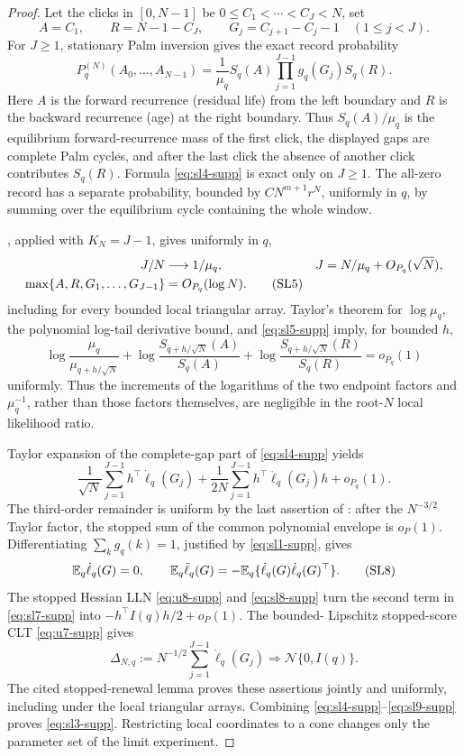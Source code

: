 \begin{proof}
Let the clicks in \([0,N-1]\) be
\(0\le C_1<\cdots<C_J<N\), set
\[
 A=C_1,\qquad R=N-1-C_J,
 \qquad G_j=C_{j+1}-C_j-1\quad(1\le j<J).
\]
For \(J\ge1\), stationary Palm inversion gives the exact record probability
\[
 P_q^{(N)}(A_0,\ldots,A_{N-1})
 =\frac1{\mu_q}S_q(A)
   \prod_{j=1}^{J-1}g_q(G_j)S_q(R).
\tag{SL4}\label{eq:sl4-supp}
\]
Here \(A\) is the forward recurrence (residual life) from the left boundary
and \(R\) is the backward recurrence (age) at the right boundary.  Thus
\(S_q(A)/\mu_q\) is the equilibrium forward-recurrence mass of the first
click, the displayed gaps are complete Palm cycles, and after the last click
the absence of another click contributes \(S_q(R)\).  Formula
\eqref{eq:sl4-supp} is exact only on \(J\ge1\).  The all-zero record has a separate
probability, bounded by \(CN^{m+1}r^N\), uniformly in \(q\), by summing over
the equilibrium cycle containing the whole window.

, applied with
\(K_N=J-1\), gives uniformly in \(q\),
\begin{align}
 J/N&\longrightarrow1/\mu_q,
 &J&=N/\mu_q+O_{P_q}(\sqrt N),\notag\\
 \max\{A,R,G_1,\ldots,G_{J-1}\}&=O_{P_q}(\log N).
\tag{SL5}\label{eq:sl5-supp}
\end{align}
including for every bounded local triangular array.  Taylor's theorem for
\(\log\mu_q\), the polynomial log-tail derivative bound, and
\eqref{eq:sl5-supp} imply, for bounded \(h\),
\[
 \log\frac{\mu_q}{\mu_{q+h/\sqrt N}}
 +\log\frac{S_{q+h/\sqrt N}(A)}{S_q(A)}
 +\log\frac{S_{q+h/\sqrt N}(R)}{S_q(R)}=o_{P_q}(1)
\tag{SL6}\label{eq:sl6-supp}
\]
uniformly.  Thus the increments of the logarithms of the two endpoint factors
and \(\mu_q^{-1}\), rather than those factors themselves, are negligible in
the root-\(N\) local likelihood ratio.

Taylor expansion of the complete-gap part of \eqref{eq:sl4-supp} yields
\[
 \frac1{\sqrt N}\sum_{j=1}^{J-1}h^\top\dot\ell_q(G_j)
 +\frac1{2N}\sum_{j=1}^{J-1}
 h^\top\ddot\ell_q(G_j)h+o_{P_q}(1).
\tag{SL7}\label{eq:sl7-supp}
\]
The third-order remainder is uniform by the last assertion of
: after the \(N^{-3/2}\)
Taylor factor, the stopped sum of the common polynomial envelope is
\(o_P(1)\).
Differentiating \(\sum_kg_q(k)=1\), justified by \eqref{eq:sl1-supp}, gives
\[
 \mathbb E_q\dot\ell_q(G)=0,\qquad
 \mathbb E_q\ddot\ell_q(G)=-\mathbb E_q\{
 \dot\ell_q(G)\dot\ell_q(G)^\top\}.
\tag{SL8}\label{eq:sl8-supp}
\]
The stopped Hessian LLN \eqref{eq:u8-supp} and \eqref{eq:sl8-supp} turn the second
term in \eqref{eq:sl7-supp} into \(-h^\top I(q)h/2+o_P(1)\).  The bounded-
Lipschitz stopped-score CLT \eqref{eq:u7-supp} gives
\[
 \Delta_{N,q}:=N^{-1/2}\sum_{j=1}^{J-1}\dot\ell_q(G_j)
 \Rightarrow\mathcal N\{0,I(q)\}.
\tag{SL9}\label{eq:sl9-supp}
\]
The cited stopped-renewal lemma proves these assertions jointly and uniformly,
including under the local triangular arrays.  Combining
\eqref{eq:sl4-supp}--\eqref{eq:sl9-supp} proves \eqref{eq:sl3-supp}.  Restricting local
coordinates to a cone changes only the parameter set of the limit experiment.
\end{proof}

